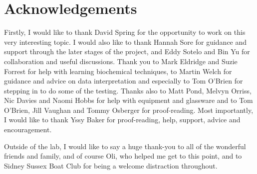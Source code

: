 \section{Acknowledgements}

Firstly, I would like to thank David Spring for the opportunity to work on this very interesting topic. I would
also like to thank Hannah Sore for guidance and support through the later stages of the project, and Eddy
Sotelo and Bin Yu for collaboration and useful discussions. Thank you to Mark Eldridge and Suzie Forrest for
help with learning biochemical techniques, to Martin Welch for guidance and advice on data interpretation and
especially to Tom O’Brien for stepping in to do some of the testing. Thanks also to Matt Pond, Melvyn Orriss,
Nic Davies and Naomi Hobbs for help with equipment and glassware and to Tom O’Brien, Jill Vaughan and
Tommy Osberger for proof-reading. Most importantly, I would like to thank Yssy Baker for proof-reading, help,
support, advice and encouragement.

Outside of the lab, I would like to say a huge thank-you to all of the wonderful friends and family, and of course Oli, who helped me get to this point, and to Sidney Sussex Boat Club for being a welcome distraction throughout. 

\newpage